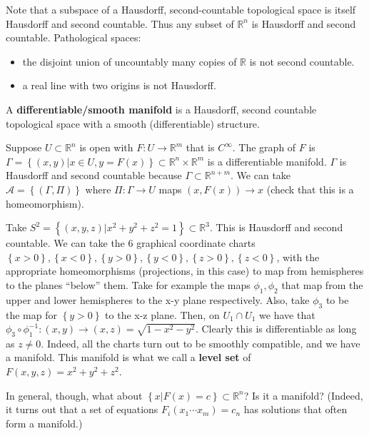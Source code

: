\documentclass{../mathnotes}
\begin{document}
Note that a subspace of a Hausdorff, second-countable topological space is itself Hausdorff and second countable. Thus any subset of $\mathbb{R}^n$ is
Hausdorff and second countable. Pathological spaces:
\begin{itemize}
    \item the disjoint union of uncountably many copies of $\mathbb{R}$ is not second countable.
    \item a real line with two origins is not Hausdorff.
\end{itemize}

\begin{defn}
    A \textbf{differentiable/smooth manifold} is a Hausdorff, second countable topological space with a smooth (differentiable) structure.
\end{defn}

\begin{exmp}
    Suppose $U\subset\mathbb{R}^n$ is open with $F:U\to\mathbb{R}^m$ that is $C^\infty$. The graph of $F$ is
    $\Gamma=\left\{ (x,y) | x\in U, y=F(x) \right\}\subset\mathbb{R}^n\times\mathbb{R}^m$
    is a differentiable manifold. $\Gamma$ is Hausdorff and second countable because $\Gamma\subset\mathbb{R}^{n+m}$. We can take $\mathcal{A}=\left\{ (\Gamma, \Pi) \right\}$
    where $\Pi:\Gamma\to U$ maps $(x,F(x))\to x$ (check that this is a homeomorphism).
\end{exmp}

\begin{exmp}
    Take $S^2=\left\{ (x,y,z) | x^2+y^2+z^2=1 \right\}\subset\mathbb{R}^3$. This is Hausdorff and second countable. We can take the 6 graphical coordinate charts
    $\left\{ x>0 \right\},\left\{ x<0 \right\},\left\{ y>0 \right\},\left\{ y<0 \right\},\left\{ z>0 \right\},\left\{ z<0 \right\}$, with the appropriate homeomorphisms
    (projections, in this case) to map from hemispheres to the planes ``below'' them. Take for example the maps $\phi_1,\phi_2$ that map from the upper and lower hemispheres
    to the x-y plane respectively. Also, take $\phi_3$ to be the map for $\left\{ y>0 \right\}$ to the x-z plane. Then, on $U_1\cap U_1$ we have that
    $\phi_3\circ\phi_1^{-1}:(x,y)\to(x,z)=\sqrt{1-x^2-y^2}$. Clearly this is differentiable as long as $z\neq0$. Indeed, all the charts turn out to be smoothly compatible, and
    we have a manifold. This manifold is what we call a \textbf{level set} of $F(x,y,z)=x^2+y^2+z^2$.
\end{exmp}

In general, though, what about $\left\{ x | F(x)=c \right\}\subset \mathbb{R}^n$? Is it a manifold? (Indeed, it turns out that a set of equations $F_i(x_1\cdots x_m)=c_n$
has solutions that often form a manifold.)
\end{document}
